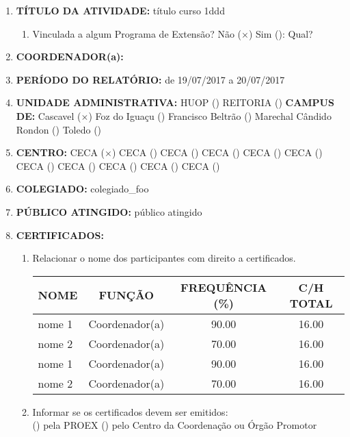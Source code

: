 \documentclass[12pt,a4paper,oneside]{article}%
\begin{document}
\begin{enumerate}%
\footnotesize%
\item%
\textbf{TÍTULO DA ATIVIDADE: }%
título curso 1ddd%
\begin{enumerate}%
\item%
Vinculada a algum Programa de Extensão? %
Não ($\times$) Sim (): Qual? %
\end{enumerate}%
\item%
\textbf{COORDENADOR(a): }%
\item%
\textbf{PERÍODO DO RELATÓRIO: }%
de 19/07/2017 a 20/07/2017%
\item%
\textbf{UNIDADE ADMINISTRATIVA: }%
HUOP () %
REITORIA () %
\newline%
\textbf{CAMPUS DE: }%
Cascavel ($\times$) %
Foz do Iguaçu () %
Francisco Beltrão () %
Marechal Cândido Rondon () %
Toledo () %
\item%
\textbf{CENTRO: }%
\newline%
CECA ($\times$) %
CECA () %
CECA () %
CECA () %
CECA () %
CECA () %
CECA () %
CECA () %
CECA () %
CECA () %
CECA () %
\item%
\textbf{COLEGIADO: }%
colegiado\_foo%
\item%
\textbf{PÚBLICO ATINGIDO: }%
público atingido%
\item%
\textbf{CERTIFICADOS: }%
\begin{enumerate}%
\item%
Relacionar o nome dos participantes com direito a certificados.%
\newline%
\begin{tabularx}{\linewidth}{|>{\centering\arraybackslash}X|
                              @{    }c@{    }|
                              @{    }c@{    }|
                              @{    }c@{    }|
                              }%
\hline%
NOME&FUNÇÃO&FREQUÊNCIA (\%)&C/H TOTAL\\%
\hline%
nome 1&Coordenador(a)&90.00&16.00\\%
\hline%
nome 2&Coordenador(a)&70.00&16.00\\%
\hline%
nome 1&Coordenador(a)&90.00&16.00\\%
\hline%
nome 2&Coordenador(a)&70.00&16.00\\%
\hline%
\end{tabularx}%
\linebreak%
\item%
Informar se os certificados devem ser emitidos: \\%
() pela PROEX \hfill () pelo Centro da Coordenação ou Órgão Promotor%

\end{enumerate}
\end{enumerate}
\end{document}
